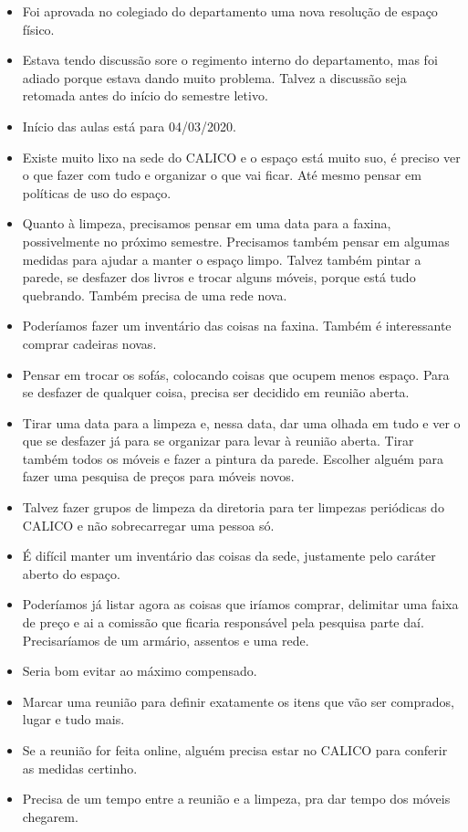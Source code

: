 \documentclass{ata-calico}
\begin{document}
\maketitle

\begin{itemize}
\item Foi aprovada no colegiado do departamento uma nova resolução de espaço físico.
\item Estava tendo discussão sore o regimento interno do departamento, mas foi adiado porque estava dando muito problema. Talvez a discussão seja retomada antes do início do semestre letivo.
\item Início das aulas está para 04/03/2020.
\end{itemize}

\begin{itemize}
\item Existe muito lixo na sede do CALICO e o espaço está muito suo, é preciso ver o que fazer com tudo e organizar o que vai ficar. Até mesmo pensar em políticas de uso do espaço.
\item Quanto à limpeza, precisamos pensar em uma data para a faxina, possivelmente no próximo semestre. Precisamos também pensar em algumas medidas para ajudar a manter o espaço limpo. Talvez também pintar a parede, se desfazer dos livros e trocar alguns móveis, porque está tudo quebrando. Também precisa de uma rede nova.
\item Poderíamos fazer um inventário das coisas na faxina. Também é interessante comprar cadeiras novas.
\item Pensar em trocar os sofás, colocando coisas que ocupem menos espaço. Para se desfazer de qualquer coisa, precisa ser decidido em reunião aberta.
\item Tirar uma data para a limpeza e, nessa data, dar uma olhada em tudo e ver o que se desfazer já para se organizar para levar à reunião aberta. Tirar também todos os móveis e fazer a pintura da parede. Escolher alguém para fazer uma pesquisa de preços para móveis novos.
\item Talvez fazer grupos de limpeza da diretoria para ter limpezas periódicas do CALICO e não sobrecarregar uma pessoa só.
\item É difícil manter um inventário das coisas da sede, justamente pelo caráter aberto do espaço.
\item Poderíamos já listar agora as coisas que iríamos comprar, delimitar uma faixa de preço e ai a comissão que ficaria responsável pela pesquisa parte daí. Precisaríamos de um armário, assentos e uma rede.
\item Seria bom evitar ao máximo compensado.
\item Marcar uma reunião para definir exatamente os itens que vão ser comprados, lugar e tudo mais.
\item Se a reunião for feita online, alguém precisa estar no CALICO para conferir as medidas certinho.
\item Precisa de um tempo entre a reunião e a limpeza, pra dar tempo dos móveis chegarem.
\end{itemize}
\end{document}
